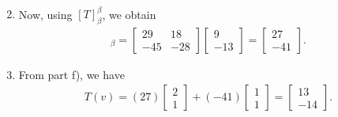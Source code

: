 \documentclass[12pt]{article}
\begin{document}
\begin{enumerate}[label=\alph*)]
\begin{align*}
		\end{align*}
	\item Now, using $[T]_{\beta}^\beta$, we obtain
		\begin{align*}
		[T(v)]_\beta = \left[\begin{matrix}29 & 18\\-45 & -28\end{matrix}\right]
\left[\begin{matrix}9\\-13\end{matrix}\right] =
\left[\begin{matrix}27\\-41\end{matrix}\right] .
		\end{align*}
	\item From part f), we have
		\begin{align*}
		T(v) = (27) \begin{bmatrix} 2 \\ 1 \end{bmatrix} + (-41) \begin{bmatrix}
		1 \\ 1
		\end{bmatrix} = \begin{bmatrix}
		13 \\ -14
		\end{bmatrix} .
		\end{align*}
	\end{enumerate}
	
	\newpage
	
\end{document}
